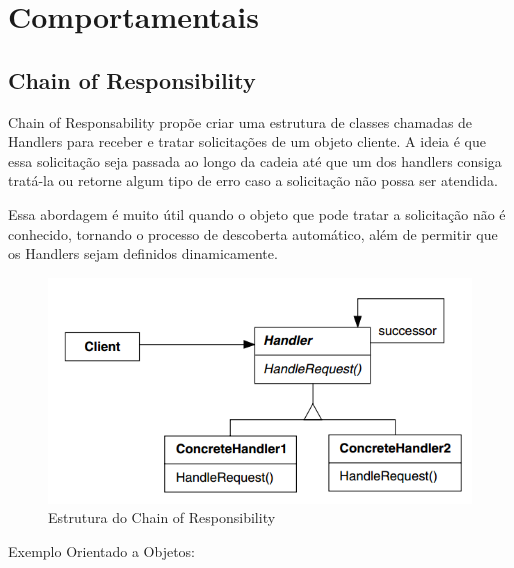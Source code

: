 \section{Comportamentais}

\subsection{Chain of Responsibility}

Chain of Responsability propõe criar uma estrutura de classes 
chamadas de Handlers para receber e tratar solicitações de um 
objeto cliente. A ideia é que essa solicitação seja passada ao 
longo da cadeia até que um dos handlers consiga tratá-la ou 
retorne algum tipo de erro caso a solicitação não possa ser 
atendida.

Essa abordagem é muito útil quando o objeto que pode tratar 
a solicitação não é conhecido, tornando o processo de 
descoberta automático, além de permitir que os Handlers sejam 
definidos dinamicamente.

\begin{figure}[htb]
	\caption{\label{fig_grafico}Estrutura do Chain of Responsibility}
	\begin{center}
	    \includegraphics[scale=0.5]{5_padroes-contexto-funcional/5.3_comportamentais/5.3.01_chain-of-responsibility/diagram.png}
	\end{center}
\end{figure}

Exemplo Orientado a Objetos:

\begin{lstlisting}[caption={Chain of Responsibility Orientação a Objetos},label=oochresponsibility]


    
\end{lstlisting}

